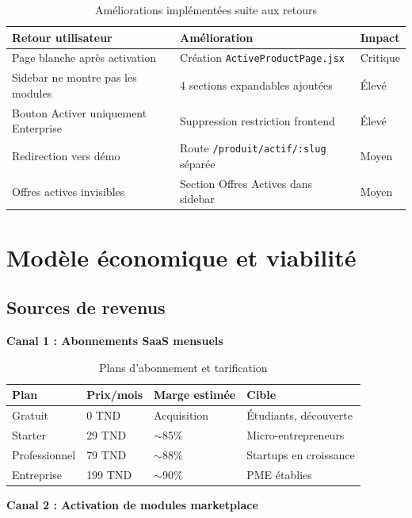 \begin{table}[H]
\centering
\caption{Améliorations implémentées suite aux retours}
\label{tab:improvements}
\begin{tabular}{|l|l|l|}
\hline
\textbf{Retour utilisateur} & \textbf{Amélioration} & \textbf{Impact} \\
\hline
Page blanche après activation & Création \texttt{ActiveProductPage.jsx} & Critique \\
\hline
Sidebar ne montre pas les modules & 4 sections expandables ajoutées & Élevé \\
\hline
Bouton Activer uniquement Enterprise & Suppression restriction frontend & Élevé \\
\hline
Redirection vers démo & Route \texttt{/produit/actif/:slug} séparée & Moyen \\
\hline
Offres actives invisibles & Section Offres Actives dans sidebar & Moyen \\
\hline
\end{tabular}
\end{table}

\section{Modèle économique et viabilité}

\subsection{Sources de revenus}

\textbf{Canal 1 : Abonnements SaaS mensuels}

\begin{table}[H]
\centering
\caption{Plans d'abonnement et tarification}
\label{tab:pricing}
\begin{tabular}{|l|l|l|l|}
\hline
\textbf{Plan} & \textbf{Prix/mois} & \textbf{Marge estimée} & \textbf{Cible} \\
\hline
Gratuit & 0 TND & Acquisition & Étudiants, découverte \\
\hline
Starter & 29 TND & $\sim$85\% & Micro-entrepreneurs \\
\hline
Professionnel & 79 TND & $\sim$88\% & Startups en croissance \\
\hline
Entreprise & 199 TND & $\sim$90\% & PME établies \\
\hline
\end{tabular}
\end{table}

\textbf{Canal 2 : Activation de modules marketplace}

